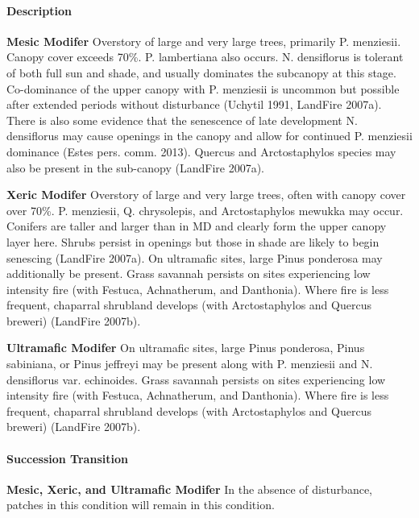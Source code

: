 \paragraph{Description}
\begin{adjustwidth}{2cm}{}
\textbf{Mesic Modifer } Overstory of large and very large trees, primarily P. menziesii. Canopy cover exceeds 70\%. P. lambertiana also occurs. N. densiflorus is tolerant of both full sun and shade, and usually dominates the subcanopy at this stage. Co-dominance of the upper canopy with P. menziesii is uncommon but possible after extended periods without disturbance (Uchytil 1991, LandFire 2007a). There is also some evidence that the senescence of late development N. densiflorus may cause openings in the canopy and allow for continued P. menziesii dominance (Estes pers. comm. 2013). Quercus and Arctostaphylos species may also be present in the sub-canopy (LandFire 2007a).

\medskip
\noindent \textbf{Xeric Modifer} Overstory of large and very large trees, often with canopy cover over 70\%. P. menziesii, Q. chrysolepis, and Arctostaphylos mewukka may occur. Conifers are taller and larger than in MD and clearly form the upper canopy layer here. Shrubs persist in openings but those in shade are likely to begin senescing (LandFire 2007a). On ultramafic sites, large Pinus ponderosa may additionally be present. Grass savannah persists on sites experiencing low intensity fire (with Festuca, Achnatherum, and Danthonia). Where fire is less frequent, chaparral shrubland develops (with Arctostaphylos and Quercus breweri) (LandFire 2007b).

\medskip
\noindent \textbf{Ultramafic Modifer} On ultramafic sites, large Pinus ponderosa, Pinus sabiniana, or Pinus jeffreyi may be present along with P. menziesii and N. densiflorus var. echinoides. Grass savannah persists on sites experiencing low intensity fire (with Festuca, Achnatherum, and Danthonia). Where fire is less frequent, chaparral shrubland develops (with Arctostaphylos and Quercus breweri) (LandFire 2007b).

\end{adjustwidth}

\paragraph{Succession Transition}
\begin{adjustwidth}{2cm}{}
\textbf{Mesic, Xeric, and Ultramafic Modifer } In the absence of disturbance, patches in this condition will remain in this condition. 

\end{adjustwidth}

